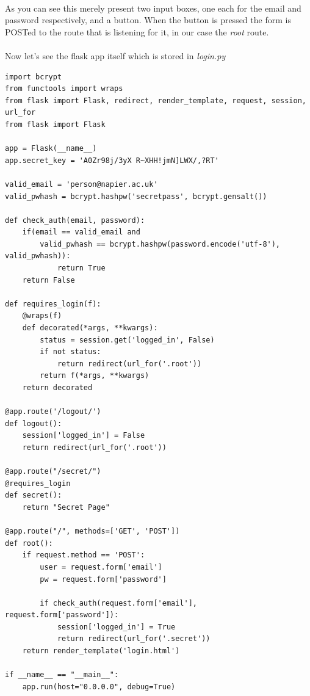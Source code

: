 \documentclass[12pt, a4paper, oneside]{book}
\begin{document}
\paragraph{} As you can see this merely present two input boxes, one each for the email and password respectively, and a button. When the button is pressed the form is POSTed to the route that is listening for it, in our case the \emph{root} route.

\paragraph{} Now let's see the flask app itself which is stored in \emph{login.py}

\begin{lstlisting}
import bcrypt
from functools import wraps
from flask import Flask, redirect, render_template, request, session, url_for
from flask import Flask

app = Flask(__name__)
app.secret_key = 'A0Zr98j/3yX R~XHH!jmN]LWX/,?RT'

valid_email = 'person@napier.ac.uk'
valid_pwhash = bcrypt.hashpw('secretpass', bcrypt.gensalt())

def check_auth(email, password):
    if(email == valid_email and 
        valid_pwhash == bcrypt.hashpw(password.encode('utf-8'), valid_pwhash)):
            return True
    return False

def requires_login(f):
    @wraps(f)
    def decorated(*args, **kwargs):
        status = session.get('logged_in', False)
        if not status:
            return redirect(url_for('.root'))
        return f(*args, **kwargs)
    return decorated

@app.route('/logout/')
def logout():
    session['logged_in'] = False
    return redirect(url_for('.root'))

@app.route("/secret/")
@requires_login
def secret():
    return "Secret Page"

@app.route("/", methods=['GET', 'POST'])
def root():
    if request.method == 'POST':
        user = request.form['email']
        pw = request.form['password']
        
        if check_auth(request.form['email'], request.form['password']):
            session['logged_in'] = True
            return redirect(url_for('.secret'))
    return render_template('login.html')

if __name__ == "__main__":
    app.run(host="0.0.0.0", debug=True)
\end{lstlisting}
\end{document}
